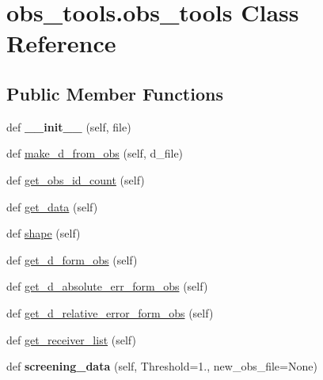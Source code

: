 \hypertarget{classobs__tools_1_1obs__tools}{}\section{obs\+\_\+tools.\+obs\+\_\+tools Class Reference}
\label{classobs__tools_1_1obs__tools}
\subsection*{Public Member Functions}
\begin{DoxyCompactItemize}
\item 
\mbox{\label{classobs__tools_1_1obs__tools_ae267c8208251f0dfcc4d3098d65786d7}} 
def {\bfseries \+\_\+\+\_\+init\+\_\+\+\_\+} (self, file)
\item 
def \hyperlink{classobs__tools_1_1obs__tools_a13206e4d851f64c4358c9f5e73c8e4f6}{make\+\_\+d\+\_\+from\+\_\+obs} (self, d\+\_\+file)
\item 
def \hyperlink{classobs__tools_1_1obs__tools_a7379f2f06972cd3aca393d871fbf6f9c}{get\+\_\+obs\+\_\+id\+\_\+count} (self)
\item 
def \hyperlink{classobs__tools_1_1obs__tools_aab9eb0080bca983ffc67c4fec7e11bd1}{get\+\_\+data} (self)
\item 
def \hyperlink{classobs__tools_1_1obs__tools_a1b3754e7b5ac69f56cadbc1684b434fd}{shape} (self)
\item 
def \hyperlink{classobs__tools_1_1obs__tools_a51fab32ffcffa108d75672017266bb07}{get\+\_\+d\+\_\+form\+\_\+obs} (self)
\item 
def \hyperlink{classobs__tools_1_1obs__tools_ab2dada1ef0e2c51563d3b5f891181c2a}{get\+\_\+d\+\_\+absolute\+\_\+err\+\_\+form\+\_\+obs} (self)
\item 
def \hyperlink{classobs__tools_1_1obs__tools_a0769e63a4da9ea3175cc44cb7c6c0824}{get\+\_\+d\+\_\+relative\+\_\+error\+\_\+form\+\_\+obs} (self)
\item 
def \hyperlink{classobs__tools_1_1obs__tools_af845d7a2d60236a1a119394ae8d2ef71}{get\+\_\+receiver\+\_\+list} (self)
\item 
\mbox{\label{classobs__tools_1_1obs__tools_a33bc2021bd438eff4c069a1e1b43ca53}} 
def {\bfseries screening\+\_\+data} (self, Threshold=1., new\+\_\+obs\+\_\+file=None)
\end{DoxyCompactItemize}


